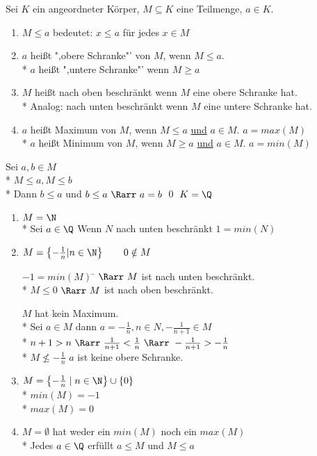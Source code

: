 	Sei $K$ ein angeordneter Körper, $M \subseteq K$ eine Teilmenge, $a \in K$.
	\begin{enumerate}
	\item{$M \leq a$ bedeutet: $x \leq a$ für jedes $x \in M$}
	\item{$a$ heißt ",obere Schranke"' von $M$, wenn $M \leq a$.\\*
		$a$ heißt ",untere Schranke"' wenn $M \geq a$}
	\item{$M$ heißt nach oben beschränkt wenn $M$ eine obere Schranke hat.\\*
	Analog: nach unten beschränkt wenn $M$ eine untere Schranke hat.}
	\item{$a$ heißt Maximum von $M$, wenn $M \leq a$ \ul{und} $a \in M$. $a = max(M)$\\*
		$a$ heißt Minimum von $M$, wenn $M \geq a$ \ul{und} $a \in M$. $a = min(M)$}
	\end{enumerate}
\bew
	Sei $a, b \in M$\\*
	$M \leq a, M \leq b$\\*
	Dann $b \leq a$ und $b \leq a\ \Rarr\ a = b$ \qed
\bsp
	$K = \Q$
	\begin{enumerate}
	\item{$M = \N$\\*
	Sei $a \in \Q$
	Wenn $N$ nach unten beschränkt $1 = min(N)$}
	\item{$M = \left\lbrace -\frac{1}{n} | n \in \N \right\rbrace \qquad 0 \notin M$
	\begin{tabbing}
	$-1 = min(M)$ \= $\Rarr\ M$ ist nach unten beschränkt.\\*
	$M \leq 0$	\> $\Rarr\ M$ ist nach oben beschränkt.
	\end{tabbing}
	$M$ hat kein Maximum.\\*
	Sei $a \in M$ dann $a = -\frac{1}{n}, n \in N, -\frac{1}{n + 1} \in M$\\*
	$n + 1 > n\ \Rarr\ \frac{1}{n + 1} < \frac{1}{n}\ \Rarr\ -\frac{1}{n + 1} > -\frac{1}{n}$\\*
	$M \nleq -\frac{1}{n}$ $a$ ist keine obere Schranke.}
	\item{$M = \left\lbrace -\frac{1}{n} \mid n \in \N\right\rbrace \cup \{ 0 \}$\\*
	$min(M) = -1$\\*
	$max(M) = 0$}
	\item{$M = \emptyset$ hat weder ein $min(M)$ noch ein $max(M)$\\*
	Jedes $a \in \Q$ erfüllt $a \leq M$ und $M \leq a$}
	\end{enumerate}

